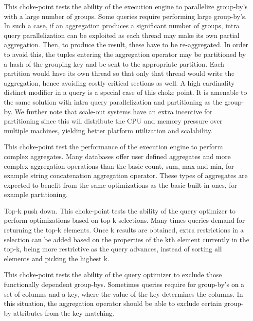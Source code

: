 This choke-point tests the ability of the execution engine to parallelize group-by's with a large number of groups. Some queries require performing large group-by's.
In such a case, if an aggregation produces a significant number of groups, intra query parallelization can be exploited as each thread may make its own partial aggregation.
Then, to produce the result, these have to be re-aggregated. In order to avoid this, the tuples entering the aggregation operator may be partitioned by a hash of the grouping key and be sent to the appropriate partition.
Each partition would have its own thread so that only that thread would write the aggregation, hence avoiding costly critical sections as well. A high cardinality distinct modifier in a query is a special case of this choke point.
It is amenable to the same solution with intra query parallelization and partitioning as the group-by.
We further note that scale-out systems have an extra incentive for partitioning since this will distribute the CPU and memory pressure over multiple machines, yielding better platform utilization and scalability.




This choke-point test the performance of the execution engine to perform complex aggregates. Many databases offer user defined aggregates and more complex aggregation operations than the basic count, sum, max and min, for example string concatenation aggregation operator. These types of aggregates are expected to benefit from the same optimizations as the basic built-in ones, for example partitioning.




Top-k push down. This choke-point tests the ability of the query optimizer to perform optimizations based on top-k selections. Many times queries demand for returning the top-k elements.
Once k results are obtained, extra restrictions in a selection can be added based on the properties of the kth element currently in the top-k, being more restrictive as the query advances, instead of sorting all elements and picking the highest k.




This choke-point tests the ability of the query optimizer to exclude those functionally dependent group-bys. Sometimes queries require for group-by's on a set of columns and a key, where the value of the key determines the columns.
In this situation, the aggregation operator should be able to exclude certain group-by attributes from the key matching.

